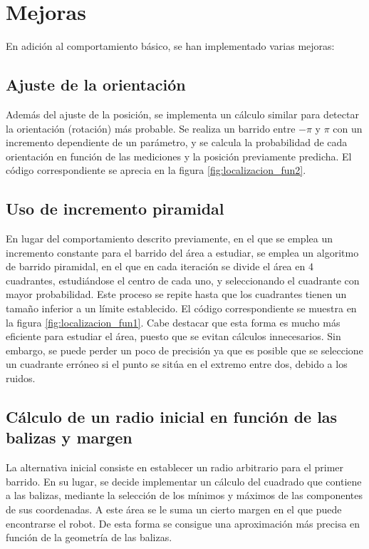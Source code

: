 
\section{Mejoras}
En adición al comportamiento básico, se han implementado varias mejoras:
\subsection{Ajuste de la orientación} Además del ajuste de la posición, se implementa un cálculo similar para detectar la orientación (rotación) más probable. Se realiza un barrido entre $-\pi$ y $\pi$ con un incremento dependiente de un parámetro, y se calcula la probabilidad de cada orientación en función de las mediciones y la posición previamente predicha. El código correspondiente se aprecia en la figura \ref{fig:localizacion_fun2}.
\subsection{Uso de incremento piramidal} En lugar del comportamiento descrito previamente, en el que se emplea un incremento constante para el barrido del área a estudiar, se emplea un algoritmo de barrido piramidal, en el que en cada iteración se divide el área en 4 cuadrantes,
estudiándose el centro de cada uno, y seleccionando el cuadrante con mayor probabilidad. Este proceso se repite hasta que los cuadrantes tienen un tamaño inferior a un límite establecido. El código correspondiente se muestra en la figura \ref{fig:localizacion_fun1}. Cabe destacar
que esta forma es mucho más eficiente para estudiar el área, puesto que se evitan cálculos innecesarios. Sin embargo, se puede perder un poco de precisión ya que es posible que se seleccione un cuadrante erróneo si el punto se sitúa en el extremo entre dos, debido a los ruidos.
\subsection{Cálculo de un radio inicial en función de las balizas y margen} La alternativa inicial consiste en establecer un radio arbitrario para el primer barrido. En su lugar,
se decide implementar un cálculo del cuadrado que contiene a las balizas, mediante la selección de los mínimos y máximos de las componentes de sus coordenadas. A este área se le suma un cierto margen
en el que puede encontrarse el robot. De esta forma se consigue una aproximación más precisa en función de la geometría de las balizas.
